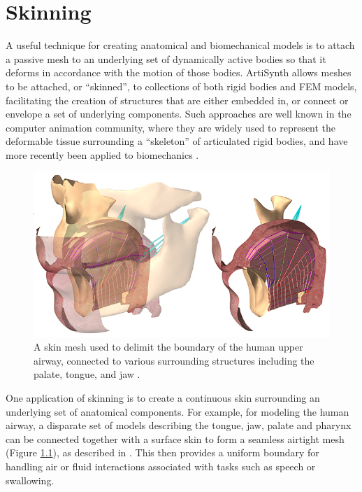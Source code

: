 \ifdefined\maindoc\else
\def\doctitle{Skinning}

\mainmatter
\fi

\chapter{Skinning}
\label{skinning:sec}

A useful technique for creating anatomical and biomechanical models is
to attach a passive mesh to an underlying set of dynamically active
bodies so that it deforms in accordance with the motion of those
bodies. ArtiSynth allows meshes to be attached, or ``skinned'', to
collections of both rigid bodies and FEM models, facilitating the
creation of structures that are either embedded in, or connect or
envelope a set of underlying components. Such 
approaches are well known in the computer animation community, where
they are widely used to represent the deformable tissue surrounding a
``skeleton'' of articulated rigid bodies, and have more recently been
applied to biomechanics \cite{nesme2009preserving}.

\begin{figure}[ht]
 \centering \includegraphics[width=5in]{images/AirwaySkinning}
 \caption{A skin mesh used to delimit the boundary of the human upper
airway, connected to various surrounding structures including
the palate, tongue, and jaw \cite{stavness2014unified}.}
\label{vocalTractSkin:fig}
\end{figure}

One application of skinning is to create a continuous skin surrounding
an underlying set of anatomical components. For example, for modeling
the human airway, a disparate set of models describing the tongue,
jaw, palate and pharynx can be connected together with a surface skin
to form a seamless airtight mesh (Figure \ref{vocalTractSkin:fig}), as
described in \cite{stavness2014unified}. This then provides a uniform
boundary for handling air or fluid interactions associated with tasks
such as speech or swallowing.

